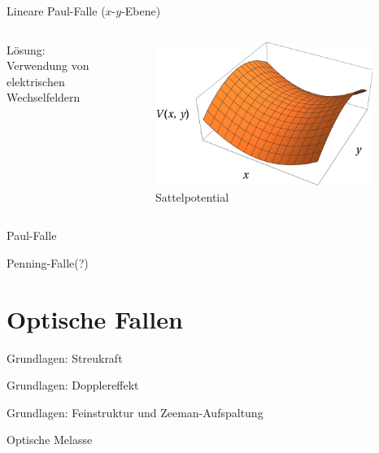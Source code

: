 \documentclass[12pt]{beamer}
\begin{document}
\begin{frame}{Lineare Paul-Falle ($x$-$y$-Ebene)}
	\begin{columns}[t]
		Lösung: Verwendung von elektrischen Wechselfeldern
		
		\begin{figure}[h]
			\centering
			\includegraphics[width=0.95\textwidth]{./figures/sattelpotential.pdf}
			\caption{Sattelpotential}
		\end{figure}
	\end{columns}
\end{frame}

\begin{frame}{Paul-Falle}
\end{frame}

\begin{frame}{Penning-Falle(?)}
\end{frame}


\section{Optische Fallen}

\begin{frame}{Grundlagen: Streukraft}
\end{frame}

\begin{frame}{Grundlagen: Dopplereffekt}
\end{frame}

\begin{frame}{Grundlagen: Feinstruktur und Zeeman-Aufspaltung}
\end{frame}

\begin{frame}{Optische Melasse}
\end{frame}
\end{document}
